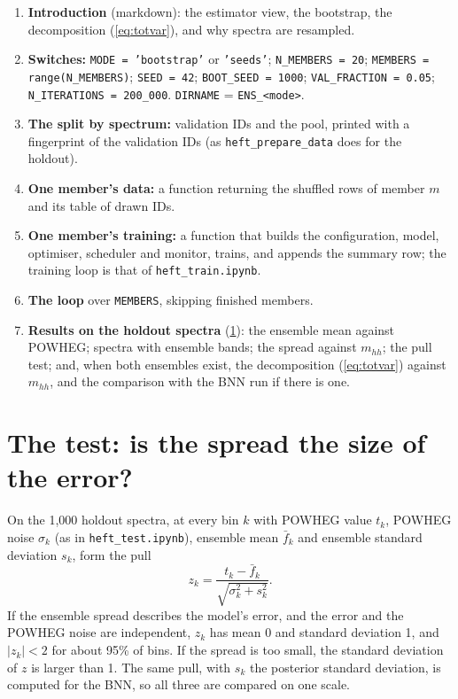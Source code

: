 \documentclass[11pt]{article}
\newcommand{\file}[1]{\nolinkurl{#1}}
\newcommand{\code}[1]{\texttt{#1}}
\newcommand{\mhh}{m_{hh}}
\begin{document}
\begin{enumerate}
  \item \textbf{Introduction} (markdown): the estimator view, the bootstrap, the
    decomposition (\ref{eq:totvar}), and why spectra are resampled.
  \item \textbf{Switches:} \code{MODE = 'bootstrap'} or \code{'seeds'};
    \code{N\_MEMBERS = 20}; \code{MEMBERS = range(N\_MEMBERS)}; \code{SEED = 42};
    \code{BOOT\_SEED = 1000}; \code{VAL\_FRACTION = 0.05};
    \code{N\_ITERATIONS = 200\_000}. \code{DIRNAME} = \file{ENS_<mode>}.
  \item \textbf{The split by spectrum:} validation IDs and the pool, printed with a
    fingerprint of the validation IDs (as \file{heft_prepare_data} does for the holdout).
  \item \textbf{One member's data:} a function returning the shuffled rows of member $m$
    and its table of drawn IDs.
  \item \textbf{One member's training:} a function that builds the configuration, model,
    optimiser, scheduler and monitor, trains, and appends the summary row; the training
    loop is that of \file{heft_train.ipynb}.
  \item \textbf{The loop} over \code{MEMBERS}, skipping finished members.
  \item \textbf{Results on the holdout spectra} (\cref{sec:test}): the ensemble mean
    against POWHEG; spectra with ensemble bands; the spread against $\mhh$; the pull test;
    and, when both ensembles exist, the decomposition (\ref{eq:totvar}) against $\mhh$, and
    the comparison with the BNN run if there is one.
\end{enumerate}

\section{The test: is the spread the size of the error?}
\label{sec:test}

On the 1,000 holdout spectra, at every bin $k$ with POWHEG value $t_k$, POWHEG noise
$\sigma_k$ (as in \file{heft_test.ipynb}), ensemble mean $\bar f_k$ and ensemble standard
deviation $s_k$, form the pull
\begin{equation}
  z_k = \frac{t_k - \bar f_k}{\sqrt{\sigma_k^2 + s_k^2}} .
  \label{eq:pull}
\end{equation}
If the ensemble spread describes the model's error, and the error and the POWHEG noise
are independent, $z_k$ has mean 0 and standard deviation 1, and $|z_k| < 2$ for about
95\% of bins. If the spread is too small, the standard deviation of $z$ is larger than 1.
The same pull, with $s_k$ the posterior standard deviation, is computed for the BNN, so all
three are compared on one scale.
\end{document}
